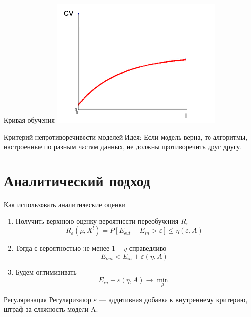 \documentclass[10pt]{beamer}
\begin{document}
{
\begin{frame}{Кривая обучения}  
  \centering
  \includegraphics[width=0.7 \textwidth]{images/learning_curve1}
\end{frame}
}

\begin{frame}{Критерий непротиворечивости моделей}  
  \alert{Идея}: Если модель верна, то алгоритмы, настроенные по разным частям данных, не должны противоречить друг другу.\\
\end{frame}

\section{Аналитический подход}

\begin{frame}{Как использовать аналитические оценки}  
  \begin{enumerate}
    \item Получить верхнюю оценку вероятности переобучения $R_{\varepsilon}$\\
      $$R_{\varepsilon}(\mu, X^l) = P[E_{out} - E_{in} > \varepsilon] \leq \eta(\varepsilon, A)$$
    \item Тогда с вероятностью не менее $1-\eta$ справедливо\\
      $$E_{out} < E_{in} + \varepsilon(\eta, A)$$
    \item Будем оптимизивать \\
      $$E_{in} + \varepsilon(\eta, A) \rightarrow \min\limits_{\mu}$$
  \end{enumerate}
\end{frame}

\begin{frame}{Регуляризация}
  Регуляризатор $\varepsilon$ — аддитивная добавка к внутреннему критерию, штраф за сложность модели A.
\end{frame}
\end{document}
